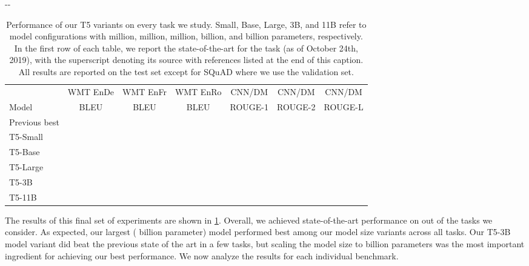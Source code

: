 \documentclass[twoside,11pt]{article}
\newlength{\offsetpage}
\newenvironment{widepage}{\begin{adjustwidth}{-\offsetpage}{-\offsetpage}\addtolength{\textwidth}{2\offsetpage}}{\end{adjustwidth}}
\newcommand{\xe}{\makebox[0pt][l]{}}
\newcommand{\xf}{\makebox[0pt][l]{}}
\newcommand{\xg}{\makebox[0pt][l]{}}
\begin{document}
\begin{table}
\begin{widepage}
\begin{tabular}{l c c c c c c}
                  & WMT EnDe      & WMT EnFr      & WMT EnRo      & CNN/DM      & CNN/DM      & CNN/DM  \\
    Model         & BLEU          & BLEU          & BLEU          & ROUGE-1     & ROUGE-2     & ROUGE-L \\
\cmidrule(r){1-1}
\cmidrule(lr){2-4}
\cmidrule(l){5-7}
    Previous best & \xe & \xe & \xf & \xg  & \xg  & \xg \\
T5-Small      &         &         &         &      &      &      \\
    T5-Base       &         &         &         &      &      &      \\
    T5-Large      &         &         &         &      &      &      \\
    T5-3B         &         &         &         &      &      &      \\
    T5-11B        &         &         &         &  &  &  \\
\bottomrule
\end{tabular}

\end{widepage}
\caption{
Performance of our T5 variants on every task we study.
Small, Base, Large, 3B, and 11B refer to model configurations with  million,  million,  million,  billion, and  billion parameters, respectively.
In the first row of each table, we report the state-of-the-art for the task (as of October 24th, 2019), with the superscript denoting its source with references listed at the end of this caption.
All results are reported on the test set except for SQuAD where we use the validation set.
\citep{lan2019albert}
\citep{wang2019structbert}
\citep{zhu2019freelb}
\citep{liu2019roberta}
\citep{edunov2018understanding}
\citep{lample2019cross}
\citep{dong2019unified}
}
\label{tab:final}
\end{table}

The results of this final set of experiments are shown in \cref{tab:final}.
Overall, we achieved state-of-the-art performance on  out of the  tasks we consider.
As expected, our largest ( billion parameter) model performed best among our model size variants across all tasks.
Our T5-3B model variant did beat the previous state of the art in a few tasks, but scaling the model size to  billion parameters was the most important ingredient for achieving our best performance.
We now analyze the results for each individual benchmark.
\end{document}
